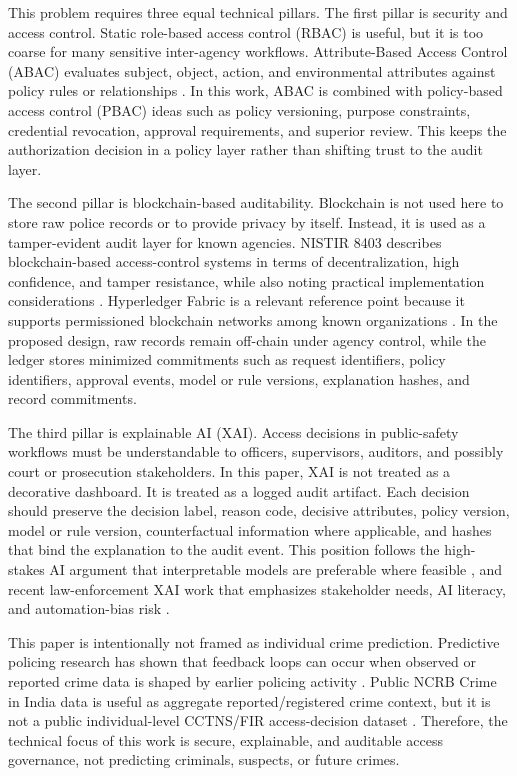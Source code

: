 This problem requires three equal technical pillars. The first pillar is security and access control. Static role-based access control (RBAC) is useful, but it is too coarse for many sensitive inter-agency workflows. Attribute-Based Access Control (ABAC) evaluates subject, object, action, and environmental attributes against policy rules or relationships \cite{nist_abac_2014}. In this work, ABAC is combined with policy-based access control (PBAC) ideas such as policy versioning, purpose constraints, credential revocation, approval requirements, and superior review. This keeps the authorization decision in a policy layer rather than shifting trust to the audit layer.

The second pillar is blockchain-based auditability. Blockchain is not used here to store raw police records or to provide privacy by itself. Instead, it is used as a tamper-evident audit layer for known agencies. NISTIR 8403 describes blockchain-based access-control systems in terms of decentralization, high confidence, and tamper resistance, while also noting practical implementation considerations \cite{nist_blockchain_access_2022}. Hyperledger Fabric is a relevant reference point because it supports permissioned blockchain networks among known organizations \cite{androulaki_fabric_2018}. In the proposed design, raw records remain off-chain under agency control, while the ledger stores minimized commitments such as request identifiers, policy identifiers, approval events, model or rule versions, explanation hashes, and record commitments.

The third pillar is explainable AI (XAI). Access decisions in public-safety workflows must be understandable to officers, supervisors, auditors, and possibly court or prosecution stakeholders. In this paper, XAI is not treated as a decorative dashboard. It is treated as a logged audit artifact. Each decision should preserve the decision label, reason code, decisive attributes, policy version, model or rule version, counterfactual information where applicable, and hashes that bind the explanation to the audit event. This position follows the high-stakes AI argument that interpretable models are preferable where feasible \cite{rudin_2019}, and recent law-enforcement XAI work that emphasizes stakeholder needs, AI literacy, and automation-bias risk \cite{zocholl_xai_law_enforcement_2025}.

This paper is intentionally not framed as individual crime prediction. Predictive policing research has shown that feedback loops can occur when observed or reported crime data is shaped by earlier policing activity \cite{ensign_feedback_2018}. Public NCRB Crime in India data is useful as aggregate reported/registered crime context, but it is not a public individual-level CCTNS/FIR access-decision dataset \cite{ncrb_2023}. Therefore, the technical focus of this work is secure, explainable, and auditable access governance, not predicting criminals, suspects, or future crimes.

